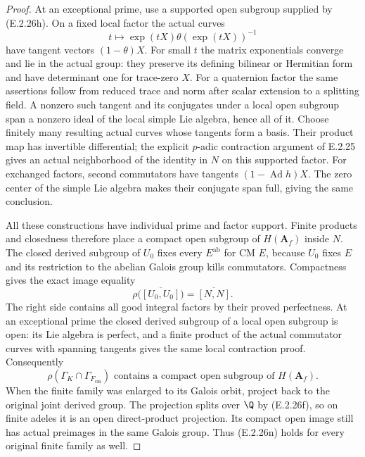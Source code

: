 \begin{proof}
At an exceptional prime, use a supported open
subgroup supplied by (E.2.26h). On a fixed local
factor the actual curves
\[
 t\longmapsto\exp(tX)\theta(\exp(tX))^{-1}
\]
have tangent vectors \((1-\theta)X\). For small
\(t\) the matrix exponentials converge and lie
in the actual group: they preserve its defining
bilinear or Hermitian form and have determinant
one for trace-zero \(X\). For a quaternion factor
the same assertions follow from reduced trace
and norm after scalar extension to a splitting
field. A nonzero such tangent and its conjugates
under a local open subgroup span a nonzero ideal
of the local simple Lie algebra, hence all of it.
Choose finitely many resulting actual curves
whose tangents form a basis. Their product map
has invertible differential; the explicit
\(p\)-adic contraction argument of E.2.25 gives
an actual neighborhood of the identity in \(N\)
on this supported factor. For exchanged factors,
second commutators have tangents
\((1-\operatorname{Ad}h)X\). The zero center of
the simple Lie algebra makes their conjugate
span full, giving the same conclusion.

All these constructions have individual prime
and factor support. Finite products and closedness
therefore place a compact open subgroup of
\(H(\mathbf A_f)\) inside \(N\).
The closed derived subgroup of \(U_0\) fixes
every \(E^{\mathrm{ab}}\) for CM \(E\), because
\(U_0\) fixes \(E\) and its restriction to
the abelian Galois group kills commutators.
Compactness gives the exact image equality
\[
 \rho\bigl(\overline{[U_0,U_0]}\bigr)
          =\overline{[N,N]}.
 \tag{E.2.26m}
\]
The right side contains all good integral factors
by their proved perfectness. At an exceptional
prime the closed derived subgroup of a local
open subgroup is open: its Lie algebra is
perfect, and a finite product of the actual
commutator curves with spanning tangents gives
the same local contraction proof. Consequently
\[
 \rho(\Gamma_K\cap\Gamma_{F_{\mathrm{cm}}})
       \text{ contains a compact open subgroup of }
       H(\mathbf A_f).
 \tag{E.2.26n}
\]
When the finite family was enlarged to its Galois
orbit, project back to the original joint derived
group. The projection splits over \(\Q\) by
(E.2.26f), so on finite adeles it is an open
direct-product projection. Its compact open
image still has actual preimages in the same
Galois group. Thus (E.2.26n) holds for every
original finite family as well.


\end{proof}
